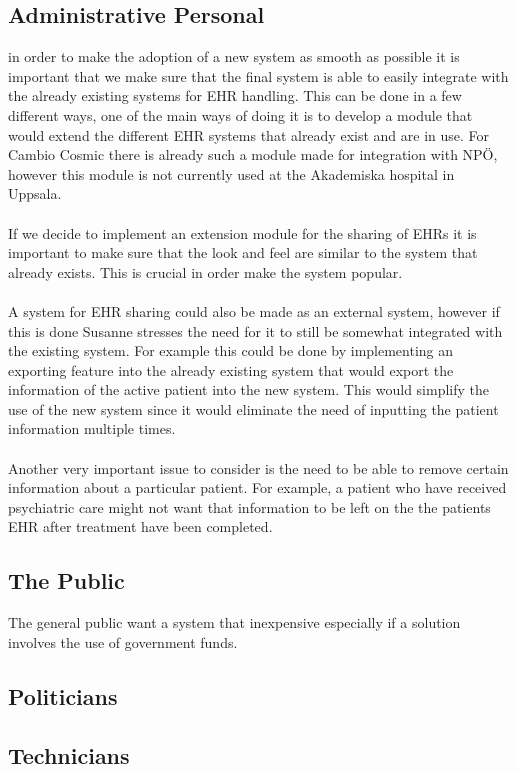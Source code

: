 \documentclass[14pt]{article}
\begin{document}
\subsection{Administrative Personal}
in order to make the adoption of a new system as smooth as possible it is important that we make sure that the final system is able to easily integrate with the already existing systems for \gls{EHR} handling. This can be done in a few different ways, one of the main ways of doing it is to develop a module that would extend the different \gls{EHR} systems that already exist and are in use.\cite{EPJ2} For Cambio Cosmic there is already such a module made for integration with NPÖ, however this module is not currently used at the Akademiska hospital in Uppsala\cite{EPJ1}.
\\\\
If we decide to implement an extension module for the sharing of \glspl{EHR} it is important to make sure that the look and feel are similar to the system that already exists. This is crucial in order make the system popular. 
\\\\
A system for \gls{EHR} sharing could also be made as an external system, however if this is done Susanne stresses the need for it to still be somewhat integrated with the existing system. For example this could be done by implementing an exporting feature into the already existing system that would export the information of the active patient into the new system. This would simplify the use of the new system since it would eliminate the need of inputting the patient information multiple times.
\\\\
Another very important issue to consider is the need to be able to remove certain information about a particular patient. For example, a patient who have received psychiatric care might not want that information to be left on the the patients \gls{EHR} after treatment have been completed\cite{EPJ1}.
\subsection{The Public}
The general public want a system that inexpensive especially if a solution involves the use of government funds.
\subsection{Politicians}
\subsection{Technicians}
\end{document}

